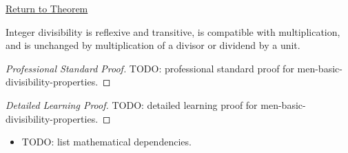 \newpage
{}
\label{prf:men-basic-divisibility-properties}

\begin{remark*}[Return]
\hyperref[thm:men-basic-divisibility-properties]{Return to Theorem}
\end{remark*}

\begin{theorem*}
Integer divisibility is reflexive and transitive, is compatible with
multiplication, and is unchanged by multiplication of a divisor or dividend by
a unit.
\end{theorem*}

\begin{proof}[Professional Standard Proof]
\LRAProofBodyStart
TODO: professional standard proof for men-basic-divisibility-properties.
\end{proof}

\begin{proof}[Detailed Learning Proof]
\LRAProofBodyStart
TODO: detailed learning proof for men-basic-divisibility-properties.
\end{proof}

\begin{remark*}
\end{remark*}

\begin{dependencies}
\begin{itemize}
  \item TODO: list mathematical dependencies.
\end{itemize}
\end{dependencies}

\clearpage

